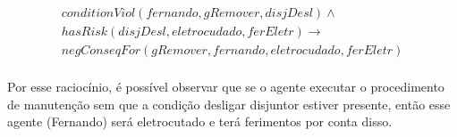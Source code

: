 \begin{eqnarray}\label{applicationCodViolIntrodCase}\nonumber
	conditionViol(fernando,gRemover,disjDesl)  \wedge \\
	hasRisk(disjDesl, eletrocudado, ferEletr) \to \nonumber \\ 
	negConseqFor(gRemover,fernando,eletrocudado,ferEletr) \nonumber \\ 
\end{eqnarray}	

Por esse raciocínio, é possível observar que se o agente executar o procedimento de manutenção sem que a condição desligar disjuntor estiver presente, então esse agente (Fernando) será eletrocutado e terá ferimentos por conta disso. 